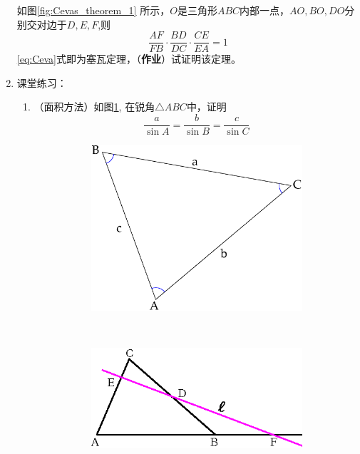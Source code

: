 \documentclass[12pt]{article}
\begin{document}
\begin{enumerate}
如图\ref{fig:Cevas_theorem_1} 所示，$O$是三角形$ABC$内部一点，$AO,BO,DO$分别交对边于$D,E,F$,则
\begin{equation}\label{eq:Ceva}
\frac{AF}{FB}\cdot\frac{BD}{DC}\cdot\frac{CE}{EA}=1
\end{equation}
\eqref{eq:Ceva}式即为塞瓦定理，（\textbf{作业}）试证明该定理。
\item 
课堂练习：
\begin{enumerate}[label=(\roman*)]
\item （面积方法）如图\ref{fig:Acute_Triangle}, 在锐角$\triangle ABC$中，证明
\begin{equation}
\frac{a}{\sin A} = \frac{b}{\sin B} = \frac{c}{\sin C}
\end{equation}
    \begin{figure}[!ht]
    \centering
    \begin{subfigure}[b]{0.4\textwidth}
    \includegraphics[width=\textwidth]{Acute_Triangle.eps}
    \caption{}\label{fig:Acute_Triangle}
    \end{subfigure}~
    \begin{subfigure}[b]{0.5\textwidth}
    \includegraphics[width=\textwidth]{Menelaus_theorem_1.eps}
    \caption{}\label{fig:Menelaus_theorem_1}
    \end{subfigure}
    \caption{}
    \end{figure}


\end{enumerate}
\end{enumerate}
\end{document}
